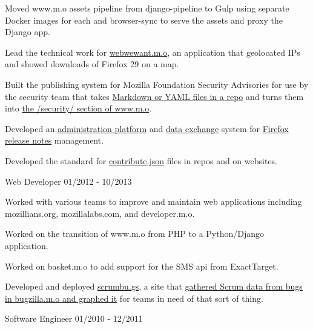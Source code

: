 \documentclass[11pt]{article} %
\begin{document}
\begin{description}
\item Moved www.m.o assets pipeline from django-pipeline to Gulp using separate Docker images for each and browser-sync to serve the assets
and proxy the Django app.

\item Lead the technical work for \href{https://blog.mozilla.org/webdev/2014/04/28/celebrating-the-web-we-want/}{webwewant.m.o},
an application that geolocated IPs and showed downloads of Firefox 29 on a map.

\item Built the publishing system for Mozilla Foundation Security Advisories for use by the security team that takes
\href{https://github.com/mozilla/foundation-security-advisories}{Markdown or YAML files in a repo} and turns them into
\href{https://www.mozilla.org/en-US/security/advisories/}{the /security/ section of www.m.o}.

\item Developed an \href{https://github.com/mozilla/nucleus/}{administration platform} and
\href{https://github.com/mozilla/release-notes/}{data exchange} system for
\href{https://www.mozilla.org/en-US/firefox/releases/}{Firefox release notes} management.

\item Developed the standard for \href{https://www.contributejson.org/}{contribute.json} files in repos and on websites.

           {Web Developer}
           {01/2012 - 10/2013}

\item Worked with various teams to improve and maintain web applications including mozillians.org, mozillalabs.com, and developer.m.o.

\item Worked on the transition of www.m.o from PHP to a Python/Django application.

\item Worked on basket.m.o to add support for the SMS api from ExactTarget.

\item Developed and deployed \href{https://github.com/mozilla/scrumbugz}{scrumbu.gs}, a site that
\href{https://blog.mozilla.org/webdev/2012/03/27/scrum-and-bugzilla/}{gathered Scrum data from bugs in bugzilla.m.o and graphed it} for teams in
need of that sort of thing.

           {Software Engineer}
           {01/2010 - 12/2011}


\end{description}
\end{document}
